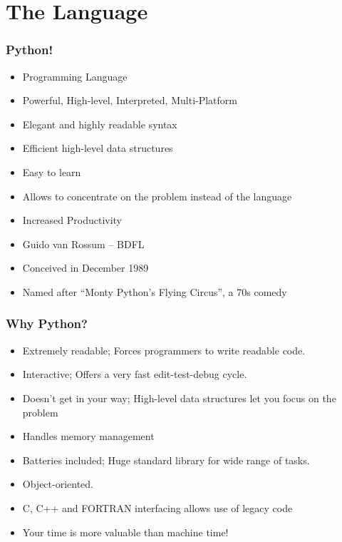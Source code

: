 \section{The Language}
\begin{frame}[fragile]
  \frametitle{Python!}
  \begin{itemize}
  \item Programming Language
  \item Powerful, High-level, Interpreted, Multi-Platform
  \item Elegant and highly readable syntax
  \item Efficient high-level data structures
  \end{itemize}
  \begin{itemize}
  \item Easy to learn
  \item Allows to concentrate on the problem instead of the language
  \item Increased Productivity
  \end{itemize}
  \begin{itemize}
  \item Guido van Rossum -- BDFL
  \item Conceived in December 1989
  \item Named after ``Monty Python's Flying Circus'', a 70s comedy
  \end{itemize}
\end{frame}

\begin{frame}[fragile]
  \frametitle{Why Python?}
  \begin{itemize}
  \item Extremely readable; Forces programmers to write readable code. 
  \item Interactive; Offers a very fast edit-test-debug cycle.
  \item Doesn't get in your way; High-level data structures let you
    focus on the problem
  \item Handles memory management
  \item Batteries included; Huge standard library for wide range of
    tasks. 
  \item Object-oriented.
  \item C, C++ and FORTRAN interfacing allows use of legacy code
  \item Your time is more valuable than machine time!
  \end{itemize}
\end{frame}


